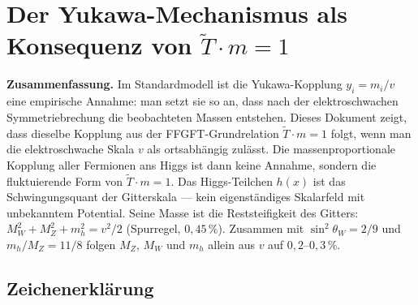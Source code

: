 \providecommand{\BM}{\textbf{[B]}}
\providecommand{\KM}{\textbf{[K]}}
\providecommand{\SM}{\textbf{[S]}}
\providecommand{\XM}{\textbf{[X]}}

\chapter*{Der Yukawa-Mechanismus als Konsequenz von $\tilde T\cdot m=1$}

{\small\noindent\textbf{Zusammenfassung.}\quad\ignorespaces
Im Standardmodell ist die Yukawa-Kopplung $y_i = m_i/v$ eine empirische
Annahme: man setzt sie so an, dass nach der elektroschwachen Symmetriebrechung
die beobachteten Massen entstehen. Dieses Dokument zeigt, dass dieselbe
Kopplung aus der FFGFT-Grundrelation $\tilde T\cdot m = 1$ folgt, wenn man
die elektroschwache Skala $v$ als ortsabhängig zulässt. Die
massenproportionale Kopplung aller Fermionen ans Higgs ist dann keine
Annahme, sondern die fluktuierende Form von $\tilde T\cdot m = 1$. Das
Higgs-Teilchen $h(x)$ ist das Schwingungsquant der Gitterskala --- kein
eigenständiges Skalarfeld mit unbekanntem Potential. Seine Masse ist
die Reststeifigkeit des Gitters: $M_W^2+M_Z^2+m_h^2 = v^2/2$ (Spurregel,
$0{,}45\,\%$). Zusammen mit $\sin^2\theta_W = 2/9$ und $m_h/M_Z = 11/8$
folgen $M_Z$, $M_W$ und $m_h$ allein aus $v$ auf $0{,}2$--$0{,}3\,\%$.
}\medskip

\section*{Zeichenerklärung}

\medskip


